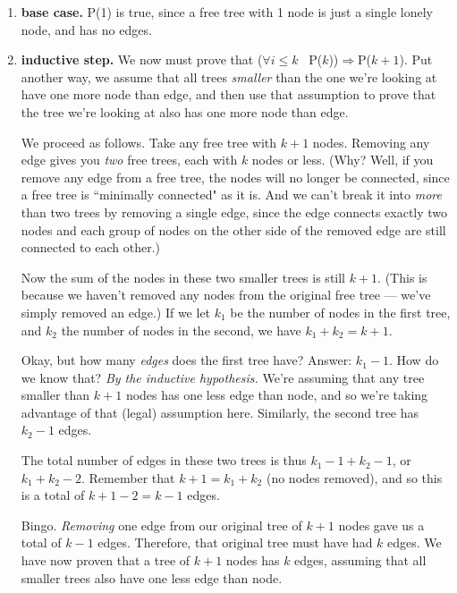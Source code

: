 \begin{enumerate} 

\item \textbf{base case.} P(1) is true, since a free tree with 1 node is
just a single lonely node, and has no edges.

\item \textbf{inductive step.}
We now must prove that ($\forall i \leq k$ \ P($k$))$\Rightarrow$P($k+1$).
Put another way, we assume that all trees \textit{smaller} than the one
we're looking at have one more node than edge, and then use that
assumption to prove that the tree we're looking at also has one more node
than edge. 

We proceed as follows. Take any free tree with $k+1$ nodes. Removing any
edge gives you \textit{two} free trees, each with $k$ nodes or less. (Why?
Well, if you remove any edge from a free tree, the nodes will no longer be
connected, since a free tree is ``minimally connected" as it is. And we
can't break it into \textit{more} than two trees by removing a single edge,
since the edge connects exactly two nodes and each group of nodes on the
other side of the removed edge are still connected to each other.)

Now the sum of the nodes in these two smaller trees is still $k+1$. (This
is because we haven't removed any nodes from the original free tree ---
we've simply removed an edge.) If we let $k_1$ be the number of nodes in
the first tree, and $k_2$ the number of nodes in the second, we have $k_1 +
k_2 = k + 1$.

Okay, but how many \textit{edges} does the first tree have? Answer: $k_1 -
1$. How do we know that? \textit{By the inductive hypothesis.} We're
assuming that any tree smaller than $k+1$ nodes has one less edge than
node, and so we're taking advantage of that (legal) assumption here.
Similarly, the second tree has $k_2 - 1$ edges.

The total number of edges in these two trees is thus $k_1 - 1 + k_2 - 1$,
or $k_1 + k_2 - 2$. Remember that $k+1 = k_1 + k_2$ (no nodes removed), and
so this is a total of $k+1-2 = k-1$ edges.

Bingo. \textit{Removing} one edge from our original tree of $k+1$ nodes
gave us a total of $k-1$ edges. Therefore, that original tree must have had
$k$ edges. We have now proven that a tree of $k+1$ nodes has $k$ edges,
assuming that all smaller trees also have one less edge than node.

\end{enumerate}

